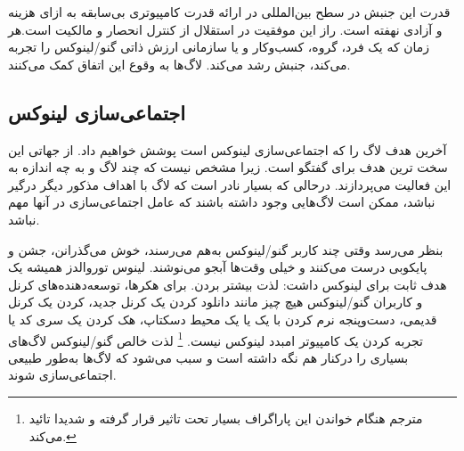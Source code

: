 
قدرت این جنبش در سطح بین‌المللی در ارائه قدرت کامپیوتری بی‌سابقه
به ازای هزینه و آزادی نهفته است. راز این موفقیت در استقلال
از کنترل انحصار و مالکیت است.هر زمان که یک فرد، گروه، کسب‌وکار
و یا سازمانی ارزش ذاتی گنو/لینوکس را تجربه می‌کند،  جنبش رشد می‌کند.
لاگ‌ها به وقوع این اتفاق کمک می‌کنند.

\subsection{اجتماعی‌سازی لینوکس}

آخرین هدف لاگ را که اجتماعی‌سازی لینوکس است پوشش خواهیم داد.
از جهاتی این سخت ترین هدف برای گفتگو است. زیرا مشخص نیست که
چند لاگ و به چه اندازه به این فعالیت می‌پردازند.
درحالی که بسیار نادر است که لاگ با اهداف مذکور دیگر درگیر نباشد،
ممکن است لاگ‌هایی وجود داشته باشند که عامل اجتماعی‌سازی در آنها مهم نباشد.

بنظر می‌رسد وقتی چند کاربر گنو/لینوکس به‌هم می‌رسند، خوش می‌گذرانن، جشن و پایکوبی
درست می‌کنند و خیلی وقت‌ها آبجو می‌نوشند. لینوس توروالدز همیشه یک هدف ثابت برای
لینوکس داشت: لذت بیشتر بردن.
برای هکرها، توسعه‌دهنده‌های کرنل و کاربران گنو/لینوکس هیچ چیز مانند دانلود کردن
یک کرنل جدید،
کردن یک کرنل قدیمی، دست‌وپنجه نرم کردن با یک
یا یک محیط دسکتاپ، هک کردن یک سری کد یا تجربه کردن یک کامپیوتر امبدد لینوکس نیست.
\footnote{مترجم هنگام خواندن این پاراگراف بسیار تحت تاثیر قرار گرفته و شدیدا تائید می‌کند.}
لذت خالص گنو/لینوکس لاگ‌های بسیاری را درکنار هم نگه داشته است و سبب می‌شود که لاگ‌ها
به‌طور طبیعی اجتماعی‌سازی شوند.

